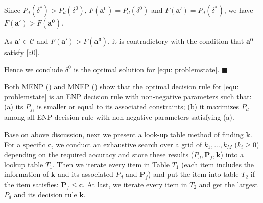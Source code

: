 Since $P_d(\delta^\ast) > P_d(\delta^0)$, $F(\mathbf{a}^0) = P_d(\delta^0)$ and  $F(\mathbf{a}') = P_d(\delta^\ast)$, we have $F(\mathbf{a'}) > F(\mathbf{a^0})$. 

As $\mathbf{a}' \in \mathcal{C}$ and $F(\mathbf{a'}) > F(\mathbf{a^0})$, it is contradictory with the condition that $\mathbf{a^0}$ satisfy \eqref{a0}.

Hence we conclude $\delta^0$ is the optimal solution for \eqref{equ: problemstate}. $\blacksquare$

Both MENP () and MNEP () show that the optimal decision rule for \eqref{equ: problemstate} is an ENP decision rule  with non-negative parameters such that: (a) its $P_{f_i}$ is smaller or equal to its associated constraints; (b) it maximizes $P_d$ among all ENP decision rule with non-negative parameters satisfying (a).

Base on above discussion, 
next we present a look-up table method of finding $\mathbf{k}$. For a specific $\mathbf{c}$, we conduct an exhaustive search over a grid of $k_1, ..., k_M$ ($k_i \geq 0$) depending on the required accuracy and store these results ($P_d, \mathbf{P}_f, \mathbf{k}$) into a lookup table $T_1$. 
Then we iterate every item in Table $T_1$ (each item includes the information of $\mathbf{k}$ and its associated $P_d$ and $\mathbf{P}_f$) and put the item into table $T_2$ if the item satisfies:  $\mathbf{P}_f \leq \mathbf{c}$. At last, we iterate every item in $T_2$ and get the largest $P_d$ and its decision rule $\mathbf{k}$.


